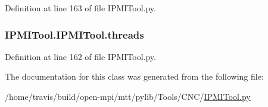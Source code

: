 Definition at line 163 of file I\-P\-M\-I\-Tool.\-py.

\hypertarget{classIPMITool_1_1IPMITool_a2f6ca8b0b509ba2c514b72312841b2d6}{
\subsubsection[{threads}]{\setlength{\rightskip}{0pt plus 5cm}I\-P\-M\-I\-Tool.\-I\-P\-M\-I\-Tool.\-threads}}\label{classIPMITool_1_1IPMITool_a2f6ca8b0b509ba2c514b72312841b2d6}


Definition at line 162 of file I\-P\-M\-I\-Tool.\-py.



The documentation for this class was generated from the following file\-:\begin{DoxyCompactItemize}
\item 
/home/travis/build/open-\/mpi/mtt/pylib/\-Tools/\-C\-N\-C/\hyperlink{IPMITool_8py}{I\-P\-M\-I\-Tool.\-py}\end{DoxyCompactItemize}
